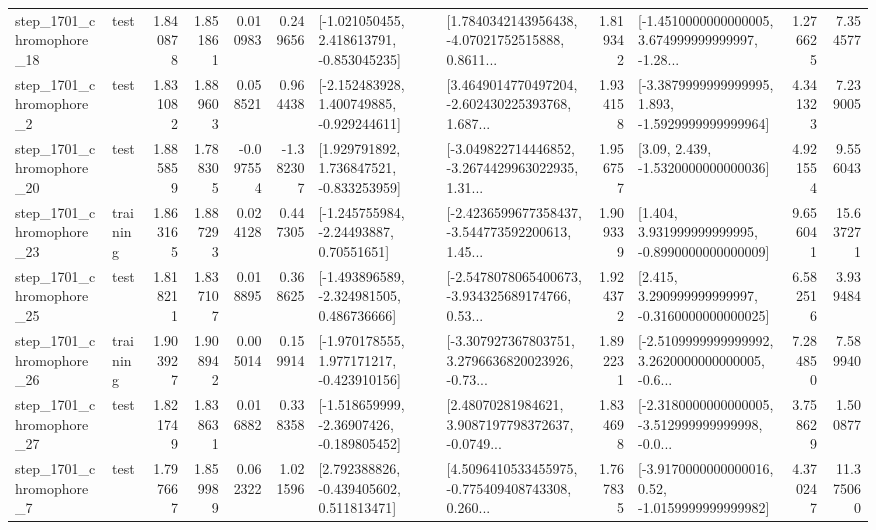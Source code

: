 \begin{tabular}{llrrrrllrlrr}
 step\_1701\_chromophore\_18 &      test &      1.840878 &    1.851861 &      0.010983 &  0.249656 &   [-1.021050455, 2.418613791, -0.853045235] &  [1.7840342143956438, -4.07021752515888, 0.8611... &       1.819342 &  [-1.4510000000000005, 3.674999999999997, -1.28... &            1.276625 &          7.354577 \\
  step\_1701\_chromophore\_2 &      test &      1.831082 &    1.889603 &      0.058521 &  0.964438 &   [-2.152483928, 1.400749885, -0.929244611] &  [3.4649014770497204, -2.602430225393768, 1.687... &       1.934158 &  [-3.3879999999999995, 1.893, -1.5929999999999964] &            4.341323 &          7.239005 \\
 step\_1701\_chromophore\_20 &      test &      1.885859 &    1.788305 &     -0.097554 & -1.382307 &    [1.929791892, 1.736847521, -0.833253959] &  [-3.049822714446852, -3.2674429963022935, 1.31... &       1.956757 &                 [3.09, 2.439, -1.5320000000000036] &            4.921554 &          9.556043 \\
 step\_1701\_chromophore\_23 &  training &      1.863165 &    1.887293 &      0.024128 &  0.447305 &     [-1.245755984, -2.24493887, 0.70551651] &  [-2.4236599677358437, -3.544773592200613, 1.45... &       1.909339 &    [1.404, 3.931999999999995, -0.8990000000000009] &            9.656041 &         15.637271 \\
 step\_1701\_chromophore\_25 &      test &      1.818211 &    1.837107 &      0.018895 &  0.368625 &   [-1.493896589, -2.324981505, 0.486736666] &  [-2.5478078065400673, -3.934325689174766, 0.53... &       1.924372 &    [2.415, 3.290999999999997, -0.3160000000000025] &            6.582516 &          3.939484 \\
 step\_1701\_chromophore\_26 &  training &      1.903927 &    1.908942 &      0.005014 &  0.159914 &   [-1.970178555, 1.977171217, -0.423910156] &  [-3.307927367803751, 3.2796636820023926, -0.73... &       1.892231 &  [-2.5109999999999992, 3.2620000000000005, -0.6... &            7.284850 &          7.589940 \\
 step\_1701\_chromophore\_27 &      test &      1.821749 &    1.838631 &      0.016882 &  0.338358 &   [-1.518659999, -2.36907426, -0.189805452] &  [2.48070281984621, 3.9087197798372637, -0.0749... &       1.834698 &  [-2.3180000000000005, -3.512999999999998, -0.0... &            3.758629 &          1.500877 \\
  step\_1701\_chromophore\_7 &      test &      1.797667 &    1.859989 &      0.062322 &  1.021596 &    [2.792388826, -0.439405602, 0.511813471] &  [4.5096410533455975, -0.775409408743308, 0.260... &       1.767835 &   [-3.9170000000000016, 0.52, -1.0159999999999982] &            4.370247 &         11.375060 \\

\end{tabular}
